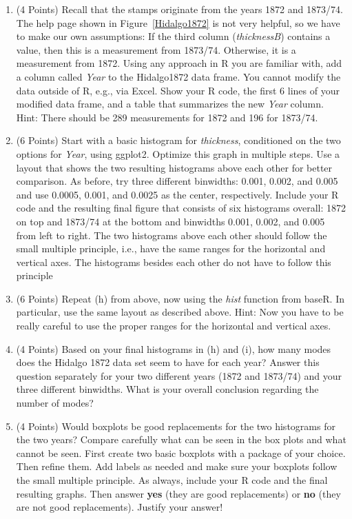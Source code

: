 \documentclass[12pt,letterpaper,final]{article}
\begin{document}
\begin{enumerate}
\begin{enumerate}
\item (4 Points)
Recall that the stamps originate from the years 1872 and 1873/74. The help page shown in
Figure~\ref{Hidalgo1872} is not very helpful, so we have to make our own assumptions:
If the third column ({\it  thicknessB}) contains a value, then this is a measurement
from 1873/74. Otherwise, it is a measurement from 1872. Using any approach in R you are
familiar with, add a column called {\it Year} to the Hidalgo1872 data frame.
You cannot modify the data outside of R, e.g., via Excel. Show your R code,
the first 6 lines of your modified data frame, and a table that summarizes
the new {\it Year} column. Hint: There should be 289 measurements for 1872
and 196 for 1873/74.



\item (6 Points)
Start with a basic histogram for {\it thickness}, conditioned on the
two options for {\it Year}, using ggplot2. Optimize this graph
in multiple steps. Use a layout that shows the two resulting
histograms above each other for better comparison.
As before,
try three different binwidths: 0.001, 0.002, and 0.005 and use 0.0005, 0.001, and 0.0025
as the center, respectively.
Include your R code and the resulting final figure
that consists of six histograms overall: 1872 on top and 1873/74 at the bottom and binwidths
0.001, 0.002, and 0.005 from left to right. The two histograms above each other
should follow the small multiple principle, i.e., have the same ranges for the
horizontal and vertical axes. The histograms besides each other do not
have to follow this principle



\item (6 Points) 
Repeat (h) from above, now using the {\it hist} function from baseR.
In particular, use the same layout as described above.
Hint: Now you have to be really careful to use the proper ranges
for the horizontal and vertical axes.



\item (4 Points)
Based on your final histograms in (h) and (i), how many modes does the Hidalgo 1872 data set
seem to have for each year? Answer this question separately for your two different years
(1872 and 1873/74) and your three different binwidths.
What is your overall conclusion regarding the number of modes?


\item (4 Points) Would boxplots be good replacements for the two histograms
for the two years? Compare carefully what can be seen in the box plots
and what cannot be seen.
First create two basic boxplots with a package of your choice. Then refine them.
Add labels as needed and make sure your boxplots follow the
small multiple principle.
As always, include your R code and the final resulting graphs.
Then answer {\bf yes} (they are good replacements) or {\bf no}
(they are not good replacements). Justify your answer!




\end{enumerate}
\end{enumerate}
\end{document}
